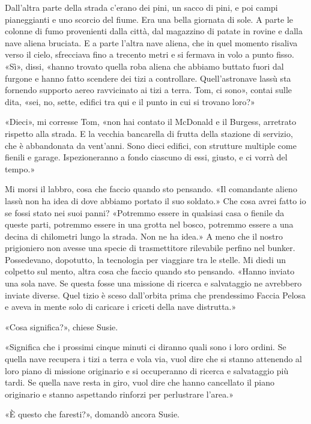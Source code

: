 Dall'altra parte della strada c'erano dei pini, un sacco di pini, e poi
campi pianeggianti e uno scorcio del fiume. Era una bella giornata di
sole. A parte le colonne di fumo provenienti dalla città, dal magazzino
di patate in rovine e dalla nave aliena bruciata. E a parte l'altra nave
aliena, che in quel momento risaliva verso il cielo, sfrecciava fino a
trecento metri e si fermava in volo a punto fisso. «Sì», dissi, «hanno
trovato quella roba aliena che abbiamo buttato fuori dal furgone e hanno
fatto scendere dei tizi a controllare. Quell'astronave lassù sta
fornendo supporto aereo ravvicinato ai tizi a terra. Tom, ci sono»,
contai sulle dita, «sei, no, sette, edifici tra qui e il punto in cui si
trovano loro?»

«Dieci», mi corresse Tom, «non hai contato il McDonald e il Burgess,
arretrato rispetto alla strada. E la vecchia bancarella di frutta della
stazione di servizio, che è abbandonata da vent'anni. Sono dieci
edifici, con strutture multiple come fienili e garage. Ispezioneranno a
fondo ciascuno di essi, giusto, e ci vorrà del tempo.»

Mi morsi il labbro, cosa che faccio quando sto pensando. «Il comandante
alieno lassù non ha idea di dove abbiamo portato il suo soldato.» Che
cosa avrei fatto io se fossi stato nei suoi panni? «Potremmo essere in
qualsiasi casa o fienile da queste parti, potremmo essere in una grotta
nel bosco, potremmo essere a una decina di chilometri lungo la strada.
Non ne ha idea.» A meno che il nostro prigioniero non avesse una specie
di trasmettitore rilevabile perfino nel bunker. Possedevano, dopotutto,
la tecnologia per viaggiare tra le stelle. Mi diedi un colpetto sul
mento, altra cosa che faccio quando sto pensando. «Hanno inviato una
sola nave. Se questa fosse una missione di ricerca e salvataggio ne
avrebbero inviate diverse. Quel tizio è sceso dall'orbita prima che
prendessimo Faccia Pelosa e aveva in mente solo di caricare i criceti
della nave distrutta.»

«Cosa significa?», chiese Susie.

«Significa che i prossimi cinque minuti ci diranno quali sono i loro
ordini. Se quella nave recupera i tizi a terra e vola via, vuol dire che
si stanno attenendo al loro piano di missione originario e si
occuperanno di ricerca e salvataggio più tardi. Se quella nave resta in
giro, vuol dire che hanno cancellato il piano originario e stanno
aspettando rinforzi per perlustrare l'area.»

«È questo che faresti?», domandò ancora Susie.

